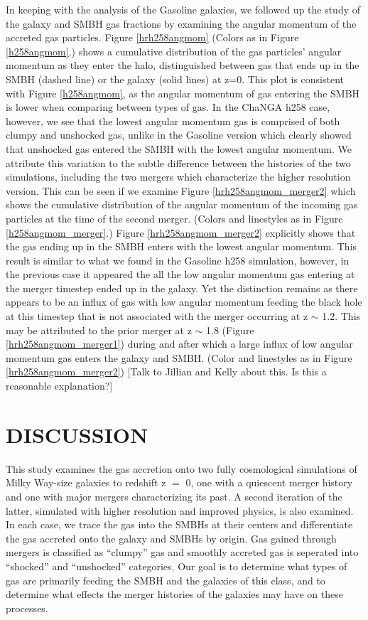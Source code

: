 \documentclass[12pt,headA,chapB]{fiskthesis}
\begin{document}
In keeping with the analysis of the Gasoline galaxies, we followed up the study of the galaxy and SMBH gas fractions by examining the angular momentum of the accreted gas particles. Figure \ref{hrh258angmom} (Colors as in Figure \ref{h258angmom}.) shows a cumulative distribution of the gas particles' angular momentum as they enter the halo, distinguished between gas that ends up in the SMBH (dashed line) or the galaxy (solid lines) at z=0. This plot is consistent with Figure \ref{h258angmom}, as the angular momentum of gas entering the SMBH is lower when comparing between types of gas. In the ChaNGA h258 case, however, we see that the lowest angular momentum gas is comprised of both clumpy and unshocked gas, unlike in the Gasoline version which clearly showed that unshocked gas entered the SMBH with the lowest angular momentum. We attribute this variation to the subtle difference between the histories of the two simulations, including the two mergers which characterize the higher resolution version. This can be seen if we examine Figure \ref{hrh258angmom_merger2} which shows the cumulative distribution of the angular momentum of the incoming gas particles at the time of the second merger. (Colors and linestyles as in Figure \ref{h258angmom_merger}.) Figure \ref{hrh258angmom_merger2} explicitly shows that the gas ending up in the SMBH enters with the lowest angular momentum. This result is similar to what we found in the Gasoline h258 simulation, however, in the previous case it appeared the all the low angular momentum gas entering at the merger timestep ended up in the galaxy. Yet the distinction remains as there appears to be an influx of gas with low angular momentum feeding the black hole at this timestep that is not associated with the merger occurring at z $\sim$ 1.2. This may be attributed to the prior merger at z $\sim$ 1.8 (Figure \ref{hrh258angmom_merger1}) during and after which a large influx of low angular momentum gas enters the galaxy and SMBH. (Color and linestyles as in Figure \ref{hrh258angmom_merger2}) [Talk to Jillian and Kelly about this. Is this a reasonable explanation?]


\chapter{\normalsize DISCUSSION}
\thispagestyle{empty}
This study examines the gas accretion onto two fully cosmological simulations of Milky Way-size galaxies to redshift z $=$ 0, one with a quiescent merger history and one with major mergers characterizing its past. A second iteration of the latter, simulated with higher resolution and improved physics, is also examined. In each case, we trace the gas into the SMBHs at their centers and differentiate the gas accreted onto the galaxy and SMBHs by origin. Gas gained through mergers is classified as ``clumpy'' gas and smoothly accreted gas is seperated into ``shocked'' and ``unshocked'' categories. Our goal is to determine what types of gas are primarily feeding the SMBH and the galaxies of this class, and to determine what effects the merger histories of the galaxies may have on these processes.
\end{document}
